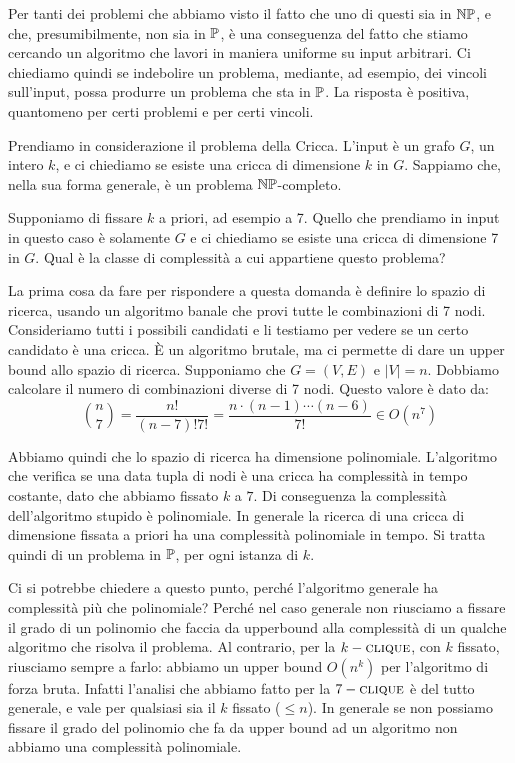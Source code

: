Per tanti dei problemi che abbiamo visto il fatto che uno di questi sia in $\mathbb{NP}$, e che,
presumibilmente, non sia in $\mathbb{P}$, è una conseguenza del fatto che stiamo cercando un algoritmo
che lavori in maniera uniforme su input arbitrari. Ci chiediamo quindi se indebolire un problema,
mediante, ad esempio, dei vincoli sull'input, possa produrre un problema che sta in $\mathbb{P}$. La
risposta è positiva, quantomeno per certi problemi e per certi vincoli.

Prendiamo in considerazione il problema della Cricca. L'input è un grafo $G$, un intero $k$, e ci
chiediamo se esiste una cricca di dimensione $k$ in $G$. Sappiamo che, nella sua forma generale, è
un problema $\mathbb{NP}$-completo.

Supponiamo di fissare $k$ a priori, ad esempio a 7. Quello che prendiamo in input in questo caso
è solamente $G$ e ci chiediamo se esiste una cricca di dimensione 7 in $G$. Qual è la classe di
complessità a cui appartiene questo problema?

La prima cosa da fare per rispondere a questa domanda è definire lo spazio di ricerca, usando un
algoritmo banale che provi tutte le combinazioni di 7 nodi. Consideriamo tutti i possibili candidati
e li testiamo per vedere se un certo candidato è una cricca. È un algoritmo brutale, ma ci
permette di dare un upper bound allo spazio di ricerca. Supponiamo che $G=(V,E)$ e $|V| = n$.
Dobbiamo calcolare il numero di combinazioni diverse di 7 nodi. Questo valore è dato da:
\begin{equation*}
    \binom{n}{7} = \frac{n!}{(n-7)!7!} = \frac{n\cdot (n-1) \cdots (n-6)}{7!} \in O(n^{7})
\end{equation*}

Abbiamo quindi che lo spazio di ricerca ha dimensione polinomiale. L'algoritmo che verifica se una
data tupla di nodi è una cricca ha complessità in tempo costante, dato che abbiamo fissato $k$ a
$7$. Di conseguenza la complessità dell'algoritmo stupido è polinomiale. In generale la ricerca di
una cricca di dimensione fissata a priori ha una complessità polinomiale in tempo. Si tratta quindi
di un problema in $\mathbb{P}$, per ogni istanza di $k$.

Ci si potrebbe chiedere a questo punto, perché l'algoritmo generale ha complessità più che
polinomiale? Perché nel caso generale non riusciamo a fissare il grado di un polinomio che faccia
da upperbound alla complessità di un qualche algoritmo che risolva il problema. Al contrario, per
la $k-\textsc{clique}$, con $k$ fissato, riusciamo sempre a farlo: abbiamo un upper bound $O(n^{k})$ per
l'algoritmo di forza bruta. Infatti l'analisi che abbiamo fatto per la $7-\textsc{clique}$ è del tutto
generale, e vale per qualsiasi sia il $k$ fissato ($\leq n$). In generale se non possiamo fissare il
grado del polinomio che fa da upper bound ad un algoritmo non abbiamo una complessità polinomiale.

